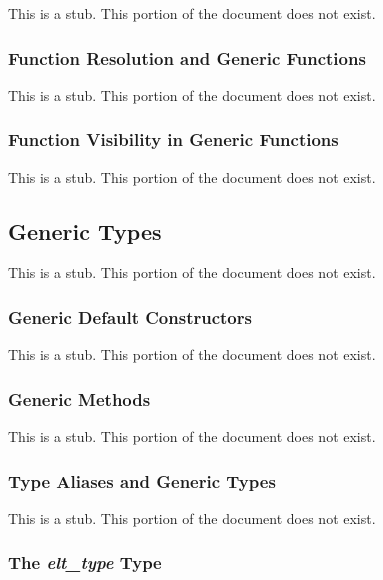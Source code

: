 This is a stub.  This portion of the document does not exist.

\subsubsection{Function Resolution and Generic Functions}
\label{Function_Resolution_and_Generic_Functions}

This is a stub.  This portion of the document does not exist.

\subsubsection{Function Visibility in Generic Functions}
\label{Function_Visibility_in_Generic_Functions}

This is a stub.  This portion of the document does not exist.

\subsection{Generic Types}
\label{Generic_Types}

This is a stub.  This portion of the document does not exist.

\subsubsection{Generic Default Constructors}
\label{Generic_Default_Constructors}

This is a stub.  This portion of the document does not exist.

\subsubsection{Generic Methods}
\label{Generic_Methods}

This is a stub.  This portion of the document does not exist.

\subsubsection{Type Aliases and Generic Types}
\label{Type_Aliases_and_Generic_Types}

This is a stub.  This portion of the document does not exist.

\subsubsection{The {\em elt\_type} Type}
\label{The_em_elt_type_Type}

